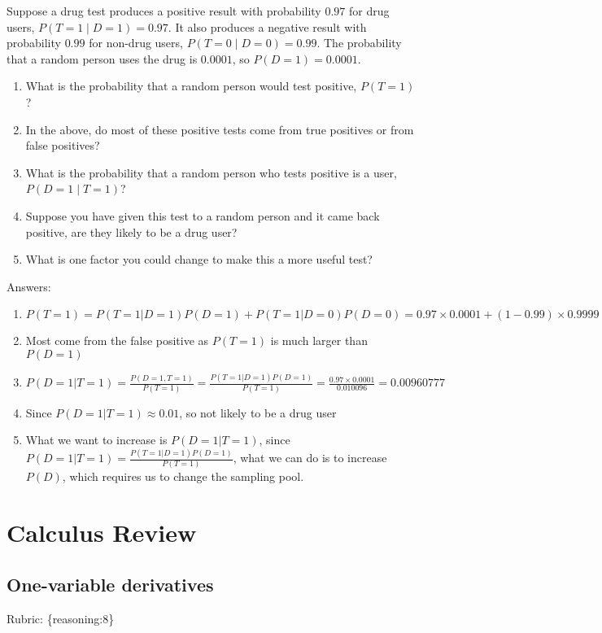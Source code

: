 \documentclass{article}
\def\rubric#1{\gre{Rubric: \{#1\}}}{}
\def\gre#1{{\color{gre}#1}}
\def\red#1{{\color{red}#1}}
\begin{document}
Suppose a drug test produces a positive result with probability $0.97$ for drug users, $P(T=1 \mid D=1)=0.97$. It also produces a negative result with probability $0.99$ for non-drug users, $P(T=0 \mid D=0)=0.99$. The probability that a random person uses the drug is $0.0001$, so $P(D=1)=0.0001$.

\begin{enumerate}
\item What is the probability that a random person would test positive, $P(T=1)$?
\item In the above, do most of these positive tests come from true positives or from false positives?
\item What is the probability that a random person who tests positive is a user, $P(D=1 \mid T=1)$?
\item Suppose you have given this test to a random person and it came back positive, are they likely to be a drug user?
\item What is one factor you could change to make this a more useful test?
\end{enumerate}
\red{Answers:
\begin{enumerate}
\item $P(T=1)=P(T=1|D=1)P(D=1)+P(T=1|D=0)P(D=0)=0.97\times0.0001+(1-0.99)\times0.9999=0.010096$
\item Most come from the false positive as $P(T=1)$ is much larger than $P(D=1)$
\item $P(D=1|T=1) = \frac{P(D=1,T=1)}{P(T=1)}=\frac{P(T=1|D=1)P(D=1)}{P(T=1)}=\frac{0.97\times 0.0001}{0.010096}=0.00960777$
\item Since $P(D=1|T=1)\approx 0.01$, so not likely to be a drug user
\item What we want to increase is $P(D=1|T=1)$, since $P(D=1|T=1)=\frac{P(T=1|D=1)P(D=1)}{P(T=1)}$, what we can do is to increase $P(D)$, which requires us to change the sampling pool.
\end{enumerate}}

\section{Calculus Review}



\subsection{One-variable derivatives}
\label{sub.one.var}
\rubric{reasoning:8}
\end{document}
